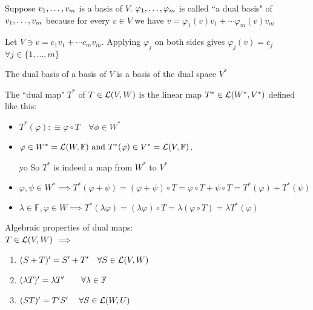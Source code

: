 \setcounter{thm}{113}
\begin{thm}
  Suppose $v_1, \dots, v_m$ is a basis of $V$. $\varphi_1, \dots, \varphi_m$ is called ``a dual basis" of $v_1, \dots, v_m$ because for every $v \in V$ we have $v=\varphi_1 (v)v_1 + \cdots \varphi_m(v)v_m$
\end{thm}
\begin{prf}
  Let $V \ni v= c_1v_1 + \cdots c_mv_m$. Applying
  $\varphi_j$ on both sides gives $\varphi_j(v)=c_j$ $\forall j\in \{1, \dots, m\}$
\end{prf}

\setcounter{thm}{115}
\begin{thm}
  The dual basis of a basis of $V$ is a basis of the dual space $V^{*}$
\end{thm}

\setcounter{thm}{117}
\begin{mydef}

  The ``dual map" $T^{*}$ of $T \in \mathcal{L}(V,W)$ is the linear map $T^{*} \in {\mathcal{L}(W^{*}, V^{*})}$ defined like this:

  \begin{itemize}
    \item[] $T^{*}(\varphi) :\equiv \varphi \circ T \quad \forall \phi \in W^{*}$
    \item $\varphi \in W^{*}={\mathcal{L}(W, \mathbb{F})} \text{ and } T^{*}(\varphi) \in V^{*} = {\mathcal{L}(V, \mathbb{F})}$.

    yo
    So $T^{*}$ is indeed a map from $W^{*}$ to $V^{*}$


    \item $\varphi, \psi \in W^{*} \implies T^{*} (\varphi + \psi) = (\varphi + \psi) \circ T = \varphi \circ T + \psi \circ T = T^{*} (\varphi) + T^{*} (\psi)$
    \item $\lambda \in \mathbb{F}, \varphi \in W \implies T^{*} (\lambda \varphi) = (\lambda \varphi) \circ T = \lambda (\varphi \circ T) = \lambda T^{*} (\varphi)$
  \end{itemize}

\end{mydef}

\setcounter{thm}{119}
\begin{thm}
  \label{algebraic-properties-of-dual-maps}
  Algebraic properties of dual maps:  \\
  $T \in \mathcal{L}(V,W)$ $\implies$
  \begin{enumerate}
    \item $(S+T)' = S' + T' \quad \forall S \in \mathcal{L}(V,W)$
    \item $(\lambda T)' = \lambda T' \quad \quad \forall \lambda \in \mathbb{F}$
    \item $(ST)' = T'S' \quad \; \forall S \in \mathcal{L} (W,U)$
  \end{enumerate}
\end{thm}

